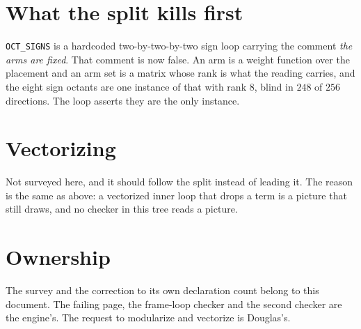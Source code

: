 \section{What the split kills first}

\texttt{OCT\_SIGNS} is a hardcoded two-by-two-by-two sign loop carrying the comment \emph{the arms are fixed}. That comment is now false. An arm is a weight function over the placement and an arm set is a matrix whose rank is what the reading carries, and the eight sign octants are one instance of that with rank \(8\), blind in \(248\) of \(256\) directions. The loop asserts they are the only instance.

\section{Vectorizing}

Not surveyed here, and it should follow the split instead of leading it. The reason is the same as above: a vectorized inner loop that drops a term is a picture that still draws, and no checker in this tree reads a picture.

\section{Ownership}

The survey and the correction to its own declaration count belong to this document. The failing page, the frame-loop checker and the second checker are the engine's. The request to modularize and vectorize is Douglas's.
